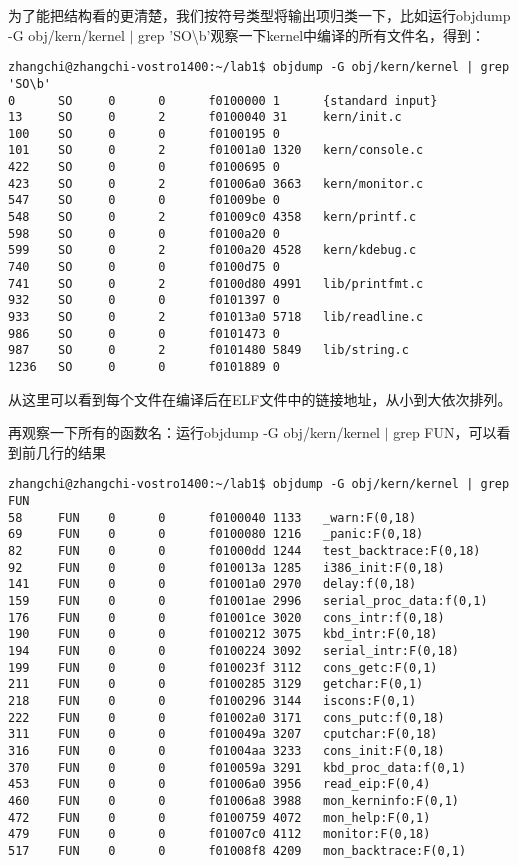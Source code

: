 \documentclass{article}
\begin{document}
\begin{CJK*}{UTF8}{gkai}
为了能把结构看的更清楚，我们按符号类型将输出项归类一下，比如运行objdump -G obj/kern/kernel $\left| \right.$ grep 'SO\textbackslash b'观察一下kernel中编译的所有文件名，得到：


\begin{lstlisting}[style=console]
zhangchi@zhangchi-vostro1400:~/lab1$ objdump -G obj/kern/kernel | grep 'SO\b'
0      SO     0      0      f0100000 1      {standard input}
13     SO     0      2      f0100040 31     kern/init.c
100    SO     0      0      f0100195 0      
101    SO     0      2      f01001a0 1320   kern/console.c
422    SO     0      0      f0100695 0      
423    SO     0      2      f01006a0 3663   kern/monitor.c
547    SO     0      0      f01009be 0      
548    SO     0      2      f01009c0 4358   kern/printf.c
598    SO     0      0      f0100a20 0      
599    SO     0      2      f0100a20 4528   kern/kdebug.c
740    SO     0      0      f0100d75 0      
741    SO     0      2      f0100d80 4991   lib/printfmt.c
932    SO     0      0      f0101397 0      
933    SO     0      2      f01013a0 5718   lib/readline.c
986    SO     0      0      f0101473 0      
987    SO     0      2      f0101480 5849   lib/string.c
1236   SO     0      0      f0101889 0      
\end{lstlisting}

从这里可以看到每个文件在编译后在ELF文件中的链接地址，从小到大依次排列。

再观察一下所有的函数名：运行objdump -G obj/kern/kernel  $\left| \right.$ grep FUN，可以看到前几行的结果



\begin{lstlisting}[style=console]
zhangchi@zhangchi-vostro1400:~/lab1$ objdump -G obj/kern/kernel | grep FUN
58     FUN    0      0      f0100040 1133   _warn:F(0,18)
69     FUN    0      0      f0100080 1216   _panic:F(0,18)
82     FUN    0      0      f01000dd 1244   test_backtrace:F(0,18)
92     FUN    0      0      f010013a 1285   i386_init:F(0,18)
141    FUN    0      0      f01001a0 2970   delay:f(0,18)
159    FUN    0      0      f01001ae 2996   serial_proc_data:f(0,1)
176    FUN    0      0      f01001ce 3020   cons_intr:f(0,18)
190    FUN    0      0      f0100212 3075   kbd_intr:F(0,18)
194    FUN    0      0      f0100224 3092   serial_intr:F(0,18)
199    FUN    0      0      f010023f 3112   cons_getc:F(0,1)
211    FUN    0      0      f0100285 3129   getchar:F(0,1)
218    FUN    0      0      f0100296 3144   iscons:F(0,1)
222    FUN    0      0      f01002a0 3171   cons_putc:f(0,18)
311    FUN    0      0      f010049a 3207   cputchar:F(0,18)
316    FUN    0      0      f01004aa 3233   cons_init:F(0,18)
370    FUN    0      0      f010059a 3291   kbd_proc_data:f(0,1)
453    FUN    0      0      f01006a0 3956   read_eip:F(0,4)
460    FUN    0      0      f01006a8 3988   mon_kerninfo:F(0,1)
472    FUN    0      0      f0100759 4072   mon_help:F(0,1)
479    FUN    0      0      f01007c0 4112   monitor:F(0,18)
517    FUN    0      0      f01008f8 4209   mon_backtrace:F(0,1)


\end{lstlisting}
\end{CJK*}
\end{document}
